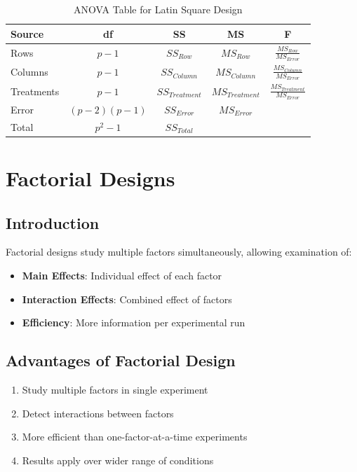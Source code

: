\documentclass[twoside]{book}
\begin{document}
\begin{table}[h]
\centering
\caption{ANOVA Table for Latin Square Design}
\begin{tabular}{|l|c|c|c|c|}
\hline
\textbf{Source} & \textbf{df} & \textbf{SS} & \textbf{MS} & \textbf{F} \\
\hline
Rows & $p-1$ & $SS_{Row}$ & $MS_{Row}$ & $\frac{MS_{Row}}{MS_{Error}}$ \\
Columns & $p-1$ & $SS_{Column}$ & $MS_{Column}$ & $\frac{MS_{Column}}{MS_{Error}}$ \\
Treatments & $p-1$ & $SS_{Treatment}$ & $MS_{Treatment}$ & $\frac{MS_{Treatment}}{MS_{Error}}$ \\
Error & $(p-2)(p-1)$ & $SS_{Error}$ & $MS_{Error}$ & \\
\hline
Total & $p^2-1$ & $SS_{Total}$ & & \\
\hline
\end{tabular}
\end{table}

\section{Factorial Designs}

\subsection{Introduction}

Factorial designs study multiple factors simultaneously, allowing examination of:
\begin{itemize}
    \item \textbf{Main Effects}: Individual effect of each factor
    \item \textbf{Interaction Effects}: Combined effect of factors
    \item \textbf{Efficiency}: More information per experimental run
\end{itemize}

\subsection{Advantages of Factorial Design}

\begin{enumerate}
    \item Study multiple factors in single experiment
    \item Detect interactions between factors
    \item More efficient than one-factor-at-a-time experiments
    \item Results apply over wider range of conditions
\end{enumerate}
\end{document}
